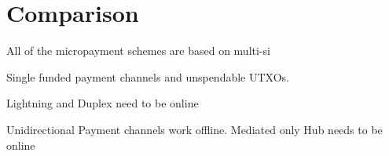 






\section{Comparison}

All of the micropayment schemes are based on multi-si

Single funded payment channels and unspendable UTXOs.

Lightning and Duplex need to be online 

Unidirectional Payment channels work offline. Mediated only Hub needs to be online 

